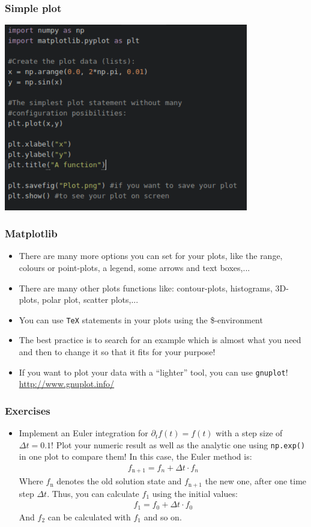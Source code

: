 \documentclass{beamer}
\begin{document}
\begin{frame}
\frametitle{Simple plot}
	\includegraphics[width = 0.8\textwidth]{SimplePlot.pdf}
\end{frame}

\begin{frame}
\frametitle{Matplotlib}
	\begin{itemize}
		\item There are many more options you can set for your plots, like the range, colours or point-plots, a legend, some arrows and text boxes,...
	 	\item There are many other plots functions like: contour-plots, histograms, 3D-plots, polar plot, scatter plots,...
	 	\item You can use \texttt{TeX} statements in your plots using the \$-environment
	 	\item The best practice is to search for an example which is almost what you need and then to change it so that it fits for your purpose!
	 	\item If you want to plot your data with a ``lighter'' tool, you can use \texttt{gnuplot}! \url{http://www.gnuplot.info/}
	\end{itemize}
\end{frame}

\begin{frame}
\frametitle{Exercises}
	\begin{itemize}
		\item Implement an Euler integration for $\partial_t f(t) = f(t)$ with a step size of $\Delta t = 0.1$! Plot your numeric result as well as the analytic one using \texttt{np.exp()} in one plot to compare them! In this case, the Euler method is:
		\begin{align}
		f_{\mathrm{n+1}} = f_{n} + \Delta t \cdot f_{n}
		\end{align}
		Where $f_{\mathrm{n}}$ denotes the old solution state and $f_{\mathrm{n}+1}$ the new one, after one time step $\Delta t$. Thus, you can calculate $f_{1}$ using the initial values:
		\begin{align}
		f_{1} = f_{0} + \Delta t \cdot f_{0}
		\end{align}
		And $f_2$ can be calculated with $f_1$ and so on.
		
	\end{itemize}
\end{frame}
\end{document}
